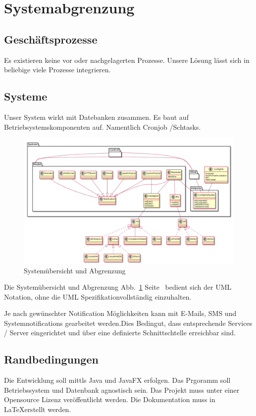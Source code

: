 \documentclass[11pt,titelpage]{scrreprt}
\begin{document}
\section {Systemabgrenzung}
\subsection{Geschäftsprozesse}
Es existieren keine vor\- oder nachgelagerten Prozesse. Unsere Lösung lässt sich in beliebige viele Prozesse integrieren.
\subsection{Systeme}
Unser System wirkt mit Datebanken zusammen. Es baut auf Betriebsystemskomponenten auf. Namentlich Cronjob /Schtasks.
\begin{landscape}
\begin{figure}
  \centering
    \includegraphics[width=1\textwidth]{../uml/uebersicht.png}
  \caption{Systemübersicht und Abgrenzung}
  \label{fig:overview}
\end{figure}
\end{landscape}
Die Systemübersicht und Abgrenzung Abb.~\ref{fig:overview} Seite~\pageref{fig:overview} bedient sich der UML Notation, ohne die UML Spezifikationvollständig einzuhalten.
\pageref{fig:overview}
 





Je nach gewünschter Notification Möglichkeiten kann mit E-Mails, SMS und Systemnotifications gearbeitet werden.Dies Bedingut, dass entsprechende Services / Server eingerichtet und über eine definierte Schnittschtelle erreichbar sind.
\subsection{Randbedingungen}
Die Entwicklung soll mittls Java und JavaFX erfolgen.
Das Prgoramm soll Betriebssystem und Datenbank agnostisch sein. Das Projekt muss unter einer Opensource Lizenz veröffentlicht werden.
Die Dokumentation muss in \LaTeX erstellt werden.
\end{document}
